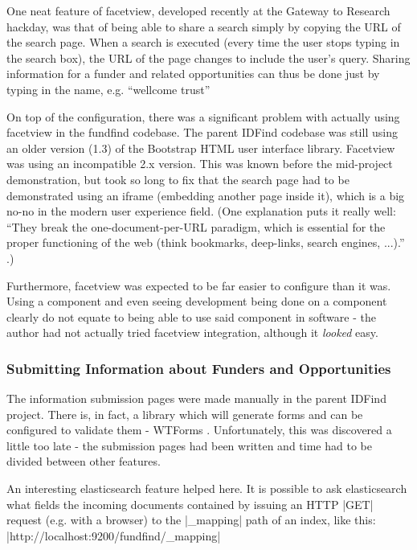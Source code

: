 One neat feature of facetview, developed recently at the Gateway to Research hackday, was that of being able to share a search simply by copying the URL of the search page. When a search is executed (every time the user stops typing in the search box), the URL of the page changes to include the user's query. Sharing information for a funder and related opportunities can thus be done just by typing in the name, e.g. ``wellcome trust'' 

On top of the configuration, there was a significant problem with actually using facetview in the fundfind codebase. The parent IDFind codebase was still using an older version (1.3) of the Bootstrap HTML user interface library. Facetview was using an incompatible 2.x version. This was known before the mid-project demonstration, but took so long to fix that the search page had to be demonstrated using an iframe (embedding another page inside it), which is a big no-no in the modern user experience field. (One explanation puts it really well: ``They break the one-document-per-URL paradigm, which is essential for the proper functioning of the web (think bookmarks, deep-links, search engines, ...).'' \cite{iframe-evil}.)

Furthermore, facetview was expected to be far easier to configure than it was. Using a component and even seeing development being done on a component clearly do not equate to being able to use said component in software - the author had not actually tried facetview integration, although it \emph{looked} easy.

\subsubsection{Submitting Information about Funders and Opportunities}
\label{impl-submitting}

The information submission pages were made manually in the parent IDFind project. There is, in fact, a library which will generate forms and can be configured to validate them - WTForms \cite{wtforms}. Unfortunately, this was discovered a little too late - the submission pages had been written and time had to be divided between other features.

An interesting elasticsearch feature helped here. It is possible to ask elasticsearch what fields the incoming documents contained by issuing an HTTP |GET| request (e.g. with a browser) to the |_mapping| path of an index, like this:
\\ |http://localhost:9200/fundfind/_mapping|

